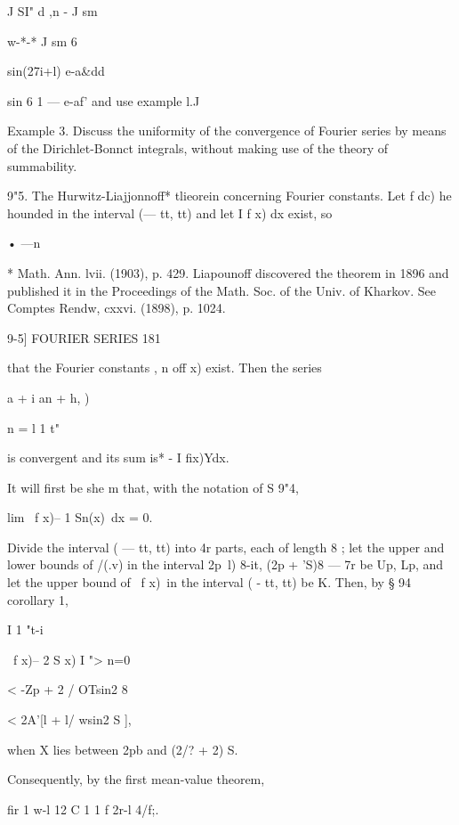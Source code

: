 J SI" d ,n -  J sm 



w-*-* J sm 6 

  sin(27i+l)  e-a\&dd 



sin 6 1 — e-af' 
and use example l.J 

Example 3. Discuss the uniformity of the convergence of Fourier series by means of 
the Dirichlet-Bonnct integrals, without making use of the theory of summability. 

9"5. The Hurwitz-Liajjonnoff* tlieorein concerning Fourier constants. 
Let f dc) he hounded in the interval (— tt, tt) and let I f x) dx exist, so 

• —n 

* Math. Ann. lvii. (1903), p. 429. Liapounoff discovered the theorem in 1896 and published 
it in the Proceedings of the Math. Soc. of the Univ. of Kharkov. See Comptes Rendw, cxxvi. 
(1898), p. 1024. 



9-5] FOURIER SERIES 181 

that the Fourier constants   ,  n off x) exist. Then the series 

 a + i  an  + h, ) 

n = l 
1 t" 

is convergent and its sum is* - I   fix)Ydx. 

It will first be she m that, with the notation of S 9"4, 



lim \ f x)-- 1 Sn(x)\ dx = 0. 



Divide the interval ( — tt, tt) into 4r parts, each of length 8 ; let the upper and lower 
bounds of /(.v) in the interval   2p~l) 8-it, (2p + 'S)8 — 7r  be Up, Lp, and let the upper 
bound of \ f x)\ in the interval ( - tt, tt) be K. Then, by § 94 corollary 1, 



I 1 "t-i 

\ f x)-- 2 S  x) 
I ">  n=0 



<   -Zp + 2 / OTsin2 8  

< 2A'[l + l/ wsin2 S ], 



when X lies between 2pb and (2/? + 2) S. 

Consequently, by the first mean-value theorem, 

fir   1 w-l 12 C 1 1 f 2r-l 4/f;. \ 

